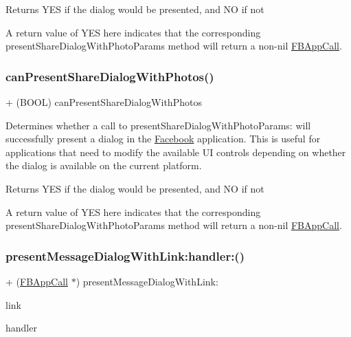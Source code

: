 \begin{DoxyReturn}{Returns}
Y\+ES if the dialog would be presented, and NO if not
\end{DoxyReturn}
A return value of Y\+ES here indicates that the corresponding present\+Share\+Dialog\+With\+Photo\+Params method will return a non-\/nil \hyperlink{interfaceFBAppCall}{F\+B\+App\+Call}. \mbox{\label{interfaceFBDialogs_a16156d6a4664e4ea55e351bc78b6e8a7}} 
\subsubsection{\texorpdfstring{can\+Present\+Share\+Dialog\+With\+Photos()}{canPresentShareDialogWithPhotos()}\hspace{0.1cm}{\footnotesize\ttfamily [5/5]}}
{\footnotesize\ttfamily + (B\+O\+OL) can\+Present\+Share\+Dialog\+With\+Photos \begin{DoxyParamCaption}{ }\end{DoxyParamCaption}}

Determines whether a call to present\+Share\+Dialog\+With\+Photo\+Params\+: will successfully present a dialog in the \hyperlink{interfaceFacebook}{Facebook} application. This is useful for applications that need to modify the available UI controls depending on whether the dialog is available on the current platform.

\begin{DoxyReturn}{Returns}
Y\+ES if the dialog would be presented, and NO if not
\end{DoxyReturn}
A return value of Y\+ES here indicates that the corresponding present\+Share\+Dialog\+With\+Photo\+Params method will return a non-\/nil \hyperlink{interfaceFBAppCall}{F\+B\+App\+Call}. \mbox{\label{interfaceFBDialogs_a33517c3089b65e7ce4c64c1c22c4e4af}} 
\subsubsection{\texorpdfstring{present\+Message\+Dialog\+With\+Link\+:handler\+:()}{presentMessageDialogWithLink:handler:()}\hspace{0.1cm}{\footnotesize\ttfamily [1/5]}}
{\footnotesize\ttfamily + (\hyperlink{interfaceFBAppCall}{F\+B\+App\+Call} $\ast$) present\+Message\+Dialog\+With\+Link\+: \begin{DoxyParamCaption}\item[{(N\+S\+U\+RL $\ast$)}]{link }\item[{handler:(F\+B\+Dialog\+App\+Call\+Completion\+Handler)}]{handler }\end{DoxyParamCaption}}

